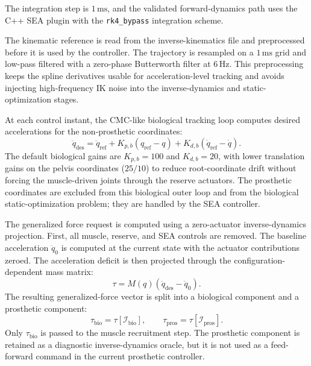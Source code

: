 
The integration step is \(1\,\mathrm{ms}\), and the
validated forward-dynamics path uses the C++ SEA plugin with the
\texttt{rk4\_bypass} integration scheme.

The kinematic reference is read from the inverse-kinematics file and
preprocessed before it is used by the controller. The trajectory is resampled on
a \(1\,\mathrm{ms}\) grid and low-pass filtered with a zero-phase Butterworth
filter at \(6\,\mathrm{Hz}\). This preprocessing keeps the spline derivatives
usable for acceleration-level tracking and avoids injecting high-frequency IK
noise into the inverse-dynamics and static-optimization stages.

At each control instant, the CMC-like biological tracking loop computes desired
accelerations for the non-prosthetic coordinates:
\begin{equation}
\ddot{q}_{\mathrm{des}} =
\ddot{q}_{\mathrm{ref}}
+ K_{p,b}(q_{\mathrm{ref}} - q)
+ K_{d,b}(\dot{q}_{\mathrm{ref}} - \dot{q}).
\label{eq:bio-outer-loop}
\end{equation}
The default biological gains are \(K_{p,b}=100\) and \(K_{d,b}=20\), with
lower translation gains on the pelvis coordinates (\(25/10\)) to reduce
root-coordinate drift without forcing the muscle-driven joints through the
reserve actuators. The prosthetic coordinates are excluded from this biological
outer loop and from the biological static-optimization problem; they are handled
by the SEA controller.

The generalized force request is computed using a zero-actuator
inverse-dynamics projection. First, all muscle, reserve, and SEA controls are
removed. The baseline acceleration \(\ddot{q}_0\) is computed at the current
state with the actuator contributions zeroed. The acceleration deficit is then
projected through the configuration-dependent mass matrix:
\begin{equation}
\tau = M(q)\left(\ddot{q}_{\mathrm{des}} - \ddot{q}_0\right).
\label{eq:id-projection}
\end{equation}
The resulting generalized-force vector is split into a biological component and
a prosthetic component:
\begin{equation}
\tau_{\mathrm{bio}} = \tau[\mathcal{I}_{\mathrm{bio}}],
\qquad
\tau_{\mathrm{pros}} = \tau[\mathcal{I}_{\mathrm{pros}}].
\label{eq:force-split}
\end{equation}
Only \(\tau_{\mathrm{bio}}\) is passed to the muscle recruitment step. The
prosthetic component is retained as a diagnostic inverse-dynamics oracle, but it
is not used as a feed-forward command in the current prosthetic controller.

